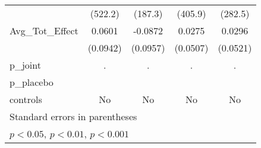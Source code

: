 {\begin{tabular}{l*{4}{c}}
            &     (522.2)         &     (187.3)         &     (405.9)         &     (282.5)         \\
\addlinespace
Avg\_Tot\_Effect&      0.0601         &     -0.0872         &      0.0275         &      0.0296         \\
            &    (0.0942)         &    (0.0957)         &    (0.0507)         &    (0.0521)         \\
\midrule
p\_joint     &           .         &           .         &           .         &           .         \\
p\_placebo   &                     &                     &                     &                     \\
controls    &          No         &          No         &          No         &          No         \\
\bottomrule
\multicolumn{5}{l}{\footnotesize Standard errors in parentheses}\\
\multicolumn{5}{l}{\footnotesize \sym{*} \(p<0.05\), \sym{**} \(p<0.01\), \sym{***} \(p<0.001\)}\\
\end{tabular}
}
